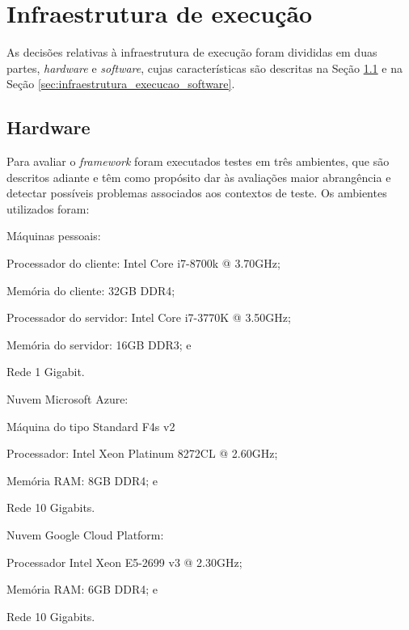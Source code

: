 \section{Infraestrutura de execução}
\label{sec:infraestrutura_execucao}

As decisões relativas à infraestrutura de execução foram divididas em duas partes, \textit{hardware} e \textit{software}, cujas características são descritas na Seção \ref{sec:infraestrutura_execucao_hardware} e na Seção \ref{sec:infraestrutura_execucao_software}.

\subsection{Hardware}
\label{sec:infraestrutura_execucao_hardware}

Para avaliar o \textit{framework} foram executados testes em três ambientes, que são descritos adiante e têm como propósito dar às avaliações maior abrangência e detectar possíveis problemas associados aos contextos de teste. Os ambientes utilizados foram:

\begin{alineas}
	\item Máquinas pessoais:
	\begin{subalineas}
		\item Processador do cliente: Intel Core i7-8700k @ 3.70GHz;
		\item Memória do cliente: 32GB DDR4;
		\item Processador do servidor: Intel Core i7-3770K @ 3.50GHz;
		\item Memória do servidor: 16GB DDR3; e
		\item Rede 1 Gigabit.
	\end{subalineas}
	\item Nuvem Microsoft Azure:
	\begin{incisos}
	    \item Máquina do tipo Standard F4s v2
		\item Processador: Intel Xeon Platinum 8272CL @ 2.60GHz;
		\item Memória RAM: 8GB DDR4; e
		\item Rede 10 Gigabits. 
	\end{incisos}
	\item Nuvem Google Cloud Platform:
	\begin{alineas}
		\item Processador Intel Xeon E5-2699 v3 @ 2.30GHz;
		\item Memória RAM: 6GB DDR4; e
		\item Rede 10 Gigabits.
	\end{alineas}
\end{alineas}

